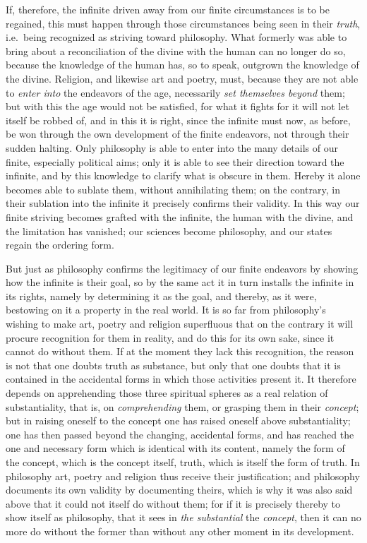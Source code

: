 \documentclass[12pt,a4paper,openany]{book}
\newcommand{\opage}[1]{\marginnote{\footnotesize\textit{[#1]}}}
\begin{document}
If, therefore, the infinite driven away from our finite circumstances is to be
regained, this must happen through those circumstances being seen in their
\emph{truth}, i.e.\ being recognized as striving toward philosophy. What formerly was
able to bring about a reconciliation of the divine with the human can no longer do
so, because the knowledge of the human has, so to speak, outgrown the knowledge of the
divine. Religion, and likewise art and poetry, must, because they are not able to
\emph{enter into} the endeavors of the age, necessarily \emph{set themselves beyond}
them; but with this the age would not be satisfied, for what it fights for it will
not let itself be robbed of, and in this it is right, since the infinite must now, as
before, be won through the own development of the finite endeavors, not through their
sudden halting. Only philosophy is able to enter into the many details of our finite,
especially political aims; only it is able to see their direction toward the
infinite, and by this knowledge to clarify what is obscure in them. Hereby it alone
becomes able to sublate them, without annihilating them; on the contrary, in their
sublation into the infinite it precisely confirms their validity. In this way our
finite striving becomes grafted with the infinite, the human with the divine, and the
limitation has vanished; our sciences become philosophy, and our states regain the
ordering form.

But just as philosophy confirms the legitimacy of our finite endeavors by showing how
the
\setcounter{footnote}{0}%
\opage{149}infinite is their goal, so by the same act it in turn installs the infinite in its
rights, namely by determining it as the goal, and thereby, as it were, bestowing on
it a property in the real world. It is so far from philosophy's wishing to make art,
poetry and religion superfluous that on the contrary it will procure recognition for
them in reality, and do this for its own sake, since it cannot do without them. If at
the moment they lack this recognition, the reason is not that one doubts truth as
substance, but only that one doubts that it is contained in the accidental forms in
which those activities present it. It therefore depends on apprehending those three
spiritual spheres as a real relation of substantiality, that is, on
\emph{comprehending} them, or grasping them in their \emph{concept}; but in raising
oneself to the concept one has raised oneself above substantiality; one has then
passed beyond the changing, accidental forms, and has reached the one and necessary
form which is identical with its content, namely the form of the concept, which is the
concept itself, truth, which is itself the form of truth. In philosophy art, poetry
and religion thus receive their justification; and philosophy documents its own
validity by documenting theirs, which is why it was also said above that it could not
itself do without them; for if it is precisely thereby to show itself as philosophy,
that it sees in \emph{the substantial} the \emph{concept}, then it can no more do
without the former than without any other moment in its development.
\end{document}
